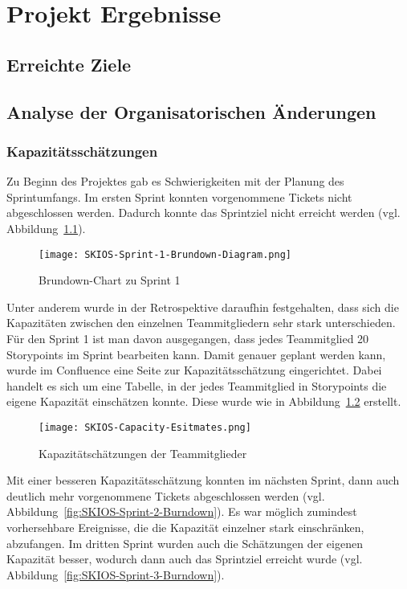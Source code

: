 
\chapter{Projekt Ergebnisse}\label{proj_ergebnisse}

\section{Erreichte Ziele}

\section{Analyse der Organisatorischen Änderungen} \label{orga_changes}

\subsection{Kapazitätsschätzungen}

Zu Beginn des Projektes gab es Schwierigkeiten mit der Planung des Sprintumfangs.
Im ersten Sprint konnten vorgenommene Tickets nicht abgeschlossen werden. 
Dadurch konnte das Sprintziel nicht erreicht werden (vgl. Abbildung~\ref{fig:SKIOS-Sprint-1-Brundown}).

\begin{figure}[h]
    \texttt{[image: SKIOS-Sprint-1-Brundown-Diagram.png]}
    \caption{Brundown-Chart zu Sprint 1}
    \label{fig:SKIOS-Sprint-1-Brundown}
\end{figure}

Unter anderem wurde in der Retrospektive daraufhin festgehalten, 
dass sich die Kapazitäten zwischen den einzelnen Teammitgliedern sehr stark unterschieden.
Für den Sprint 1 ist man davon ausgegangen, dass jedes Teammitglied 20 Storypoints im Sprint bearbeiten kann.
Damit genauer geplant werden kann, wurde im Confluence eine Seite zur Kapazitätsschätzung eingerichtet.
Dabei handelt es sich um eine Tabelle, in der jedes Teammitglied in Storypoints die eigene Kapazität einschätzen konnte.
Diese wurde wie in Abbildung~\ref{fig:Capacitytable} erstellt. 

\begin{figure}[h]
    \texttt{[image: SKIOS-Capacity-Esitmates.png]}
    \caption{Kapazitätschätzungen der Teammitglieder}
    \label{fig:Capacitytable}
\end{figure}

Mit einer besseren Kapazitätsschätzung konnten im nächsten Sprint, dann auch deutlich mehr vorgenommene Tickets abgeschlossen werden (vgl. Abbildung~\ref{fig:SKIOS-Sprint-2-Burndown}).
Es war möglich zumindest vorhersehbare Ereignisse, die die Kapazität einzelner stark einschränken, abzufangen.
Im dritten Sprint wurden auch die Schätzungen der eigenen Kapazität besser, wodurch dann auch das Sprintziel erreicht wurde (vgl. Abbildung~\ref{fig:SKIOS-Sprint-3-Burndown}).

